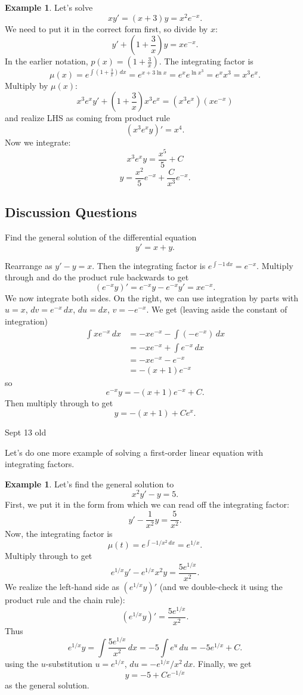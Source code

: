 \documentclass[12pt]{amsart}
\numberwithin{equation}{section}
\theoremstyle{plain} %
\newcommand{\Sept}[1]{Sept #1 old}
\theoremstyle{definition}
\newtheorem{ex}[equation]{Example}
\theoremstyle{remark}
\begin{document}
\begin{ex}
Let's solve
\[ x y' = (x+3) y = x^2 e^{-x}.\]
We need to put it in the correct form first, so divide by $x$:
\[ y' + (1+\frac{3}{x}) y = x e^{-x}.\]
In the earlier notation, $p(x) = (1+\frac{3}{x})$. The integrating factor is
\[ \mu(x)=e^{\int (1+\frac{3}{x}) \, dx} = e^{ x + 3 \ln x} = e^x  e^{\ln x^3} = e^x  x^3 = x^3 e^x.\]
Multiply by $\mu(x)$:
\[ x^3 e^x y' + (1+\frac{3}{x}) x^3 e^x = (x^3 e^x) (x e^{-x})\]
and realize LHS as coming from product rule
\[ (x^3 e^x y)' = x^4.\]
Now we integrate:
\[ x^3 e^x  y = \frac{x^5}{5} + C\]
\[ y = \frac{x^2}{5} e^{-x} + \frac{C}{x^3} e^{-x}.\]
\end{ex}

\subsection*{Discussion Questions} Find the general solution of the differential equation
\[ y' = x+ y.\]


\begin{framed}
Rearrange as $y' - y = x$. Then the integrating factor is $e^{\int -1 \, dx} = e^{-x}$. Multiply through and do the product rule backwards to get
\[ (e^{-x} y)' =e^{-x} y - e^{-x} y' = x e^{-x}.\]
We now integrate both sides. On the right, we can use integration by parts with $u=x$, $dv= e^{-x} \, dx$, $du= dx$, $v= -e^{-x}$. We get (leaving aside the constant of integration)
\begin{align*} \int x e^{-x} \, dx& = - x e^{-x} - \int (-e^{-x}) \, dx \\&= -xe^{-x} + \int e^{-x} \, dx \\&= -xe^{-x}  - e^{-x} \\&= -(x+1) e^{-x}\end{align*}
so \[ e^{-x} y = - (x+1) e^{-x} + C.\]
Then multiply through to get
\[ y = -(x+1) + C e^x.\]
\end{framed}


\Sept{13}

Let's do one more example of solving a first-order linear equation with integrating factors.

\begin{ex} Let's find the general solution to
\[ x^2 y' - y = 5.\]
First, we put it in the form from which we can read off the integrating factor:
\[ y' - \frac{1}{x^2} y = \frac{5}{x^2}.\]
Now, the integrating factor is
\[ \mu(t) = e^{\int -1/x^2 \, dx} = e^{1/x}.\]
Multiply through to get
\[ e^{1/x} y' - e^{1/x}{x^2} y = \frac{ 5 e^{1/x}}{x^2}.\]
We realize the left-hand side as $(e^{1/x} y)'$ (and we double-check it using the product rule and the chain rule):
\[ (e^{1/x} y)' = \frac{ 5 e^{1/x}}{x^2}.\]
Thus
\[ e^{1/x} y = \int \frac{ 5 e^{1/x}}{x^2} \, dx = -5 \int e^{u} \, du = -5 e^{1/x} + C.\]
using the $u$-substitution $u=e^{1/x}$, $du= -e^{1/x}/x^2 \, dx$.
Finally, we get
\[ y = -5 + C e^{-1/x}\]
as the general solution.
\end{ex}
\end{document}
